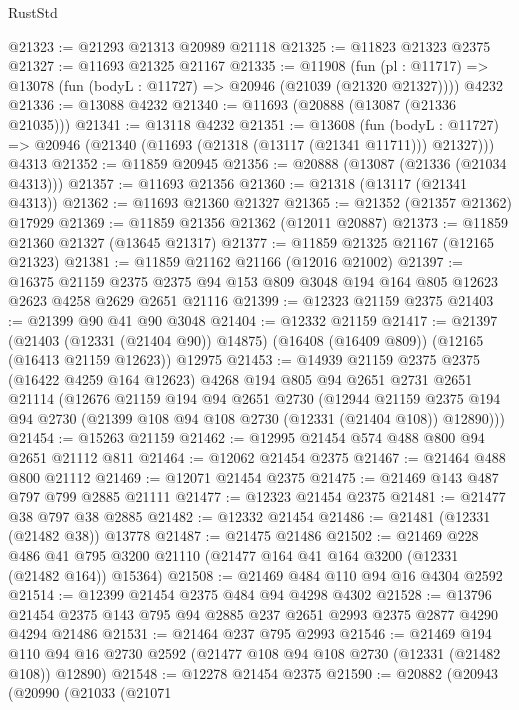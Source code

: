 \begin{lexlean}{RustStd}
\begin{coremodule}
@21323 := @21293 @21313 @20989 @21118
@21325 := @11823 @21323 @2375
@21327 := @11693 @21325 @21167
@21335 := @11908
    (fun (pl : @11717) => @13078 (fun (bodyL : @11727) => @20946 (@21039 (@21320 @21327))))
    @4232
@21336 := @13088 @4232
@21340 := @11693 (@20888 (@13087 (@21336 @21035)))
@21341 := @13118 @4232
@21351 := @13608
    (fun (bodyL : @11727) => @20946 (@21340 (@11693 (@21318 (@13117 (@21341 @11711))) @21327)))
    @4313
@21352 := @11859 @20945
@21356 := @20888 (@13087 (@21336 (@21034 @4313)))
@21357 := @11693 @21356
@21360 := @21318 (@13117 (@21341 @4313))
@21362 := @11693 @21360 @21327
@21365 := @21352 (@21357 @21362) @17929
@21369 := @11859 @21356 @21362 (@12011 @20887)
@21373 := @11859 @21360 @21327 (@13645 @21317)
@21377 := @11859 @21325 @21167 (@12165 @21323)
@21381 := @11859 @21162 @21166 (@12016 @21002)
@21397 := @16375
    @21159
    @2375
    @2375
    @94
    @153
    @809
    @3048
    @194
    @164
    @805
    @12623
    @2623
    @4258
    @2629
    @2651
    @21116
@21399 := @12323 @21159 @2375
@21403 := @21399 @90 @41 @90 @3048
@21404 := @12332 @21159
@21417 := @21397
    (@21403 (@12331 (@21404 @90)) @14875)
    (@16408 (@16409 @809))
    (@12165 (@16413 @21159 @12623))
    @12975
@21453 := @14939
    @21159
    @2375
    @2375
    (@16422 @4259 @164 @12623)
    @4268
    @194
    @805
    @94
    @2651
    @2731
    @2651
    @21114
    (@12676
      @21159
      @194
      @94
      @2651
      @2730
      (@12944
        @21159
        @2375
        @194
        @94
        @2730
        (@21399 @108 @94 @108 @2730 (@12331 (@21404 @108)) @12890)))
@21454 := @15263 @21159
@21462 := @12995 @21454 @574 @488 @800 @94 @2651 @21112 @811
@21464 := @12062 @21454 @2375
@21467 := @21464 @488 @800 @21112
@21469 := @12071 @21454 @2375
@21475 := @21469 @143 @487 @797 @799 @2885 @21111
@21477 := @12323 @21454 @2375
@21481 := @21477 @38 @797 @38 @2885
@21482 := @12332 @21454
@21486 := @21481 (@12331 (@21482 @38)) @13778
@21487 := @21475 @21486
@21502 := @21469
    @228
    @486
    @41
    @795
    @3200
    @21110
    (@21477 @164 @41 @164 @3200 (@12331 (@21482 @164)) @15364)
@21508 := @21469 @484 @110 @94 @16 @4304 @2592
@21514 := @12399 @21454 @2375 @484 @94 @4298 @4302
@21528 := @13796 @21454 @2375 @143 @795 @94 @2885 @237 @2651 @2993 @2375 @2877 @4290 @4294 @21486
@21531 := @21464 @237 @795 @2993
@21546 := @21469
    @194
    @110
    @94
    @16
    @2730
    @2592
    (@21477 @108 @94 @108 @2730 (@12331 (@21482 @108)) @12890)
@21548 := @12278 @21454 @2375
@21590 := @20882
    (@20943
      (@20990
        (@21033
          (@21071

\end{coremodule}
\end{lexlean}
